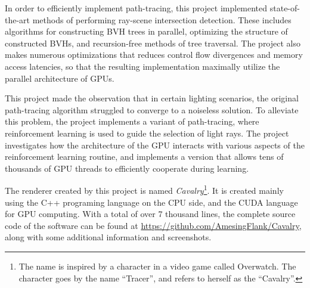 In order to efficiently implement path-tracing, this project implemented state-of-the-art methods of performing ray-scene intersection detection. These includes algorithms for constructing BVH trees in parallel, optimizing the structure of constructed BVHs, and recursion-free methods of tree traversal. The project also makes numerous optimizations that reduces control flow divergences and memory access latencies, so that the resulting implementation maximally utilize the parallel architecture of GPUs.  

This project made the observation that in certain lighting scenarios, the original path-tracing algorithm struggled to converge to a noiseless solution. To alleviate this problem, the project implements a variant of path-tracing, where reinforcement learning is used to guide the selection of light rays. The project investigates how the architecture of the GPU interacts with various aspects of the reinforcement learning routine, and implements a version that allows tens of thousands of GPU threads to efficiently cooperate during learning. 


The renderer created by this project is named \textit{Cavalry}\footnote{The name is inspired by a character in a video game called Overwatch. The character goes by the name ``Tracer'', and refers to herself as the ``Cavalry''.}. It is created mainly using the C++ programing language on the CPU side, and the CUDA language for GPU computing. With a total of over 7 thousand lines, the complete source code of the software can be found at \url{https://github.com/AmesingFlank/Cavalry}, along with some additional information and screenshots.
